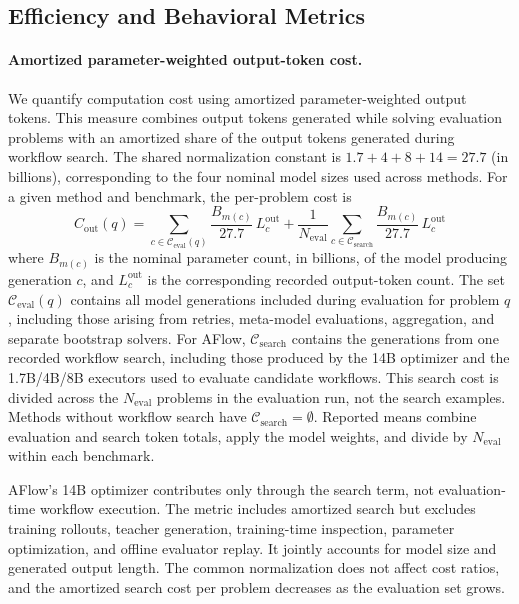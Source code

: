 \subsection{Efficiency and Behavioral Metrics}
\label{app:efficiency_metrics}

\paragraph{Amortized parameter-weighted output-token cost.}
We quantify computation cost using amortized parameter-weighted output tokens. This measure combines output tokens generated while solving evaluation problems with an amortized share of the output tokens generated during workflow search. The shared normalization constant is $1.7+4+8+14=27.7$ (in billions), corresponding to the four nominal model sizes used across methods. For a given method and benchmark, the per-problem cost is
\begin{equation}
 C_{\mathrm{out}}(q)
 =\sum_{c\in\mathcal{C}_{\mathrm{eval}}(q)}
   \frac{B_{m(c)}}{27.7}\,L_c^{\mathrm{out}}
 +\frac{1}{N_{\mathrm{eval}}}
  \sum_{c\in\mathcal{C}_{\mathrm{search}}}
   \frac{B_{m(c)}}{27.7}\,L_c^{\mathrm{out}}
 \label{eq:app-weighted-tokens}
\end{equation}
where $B_{m(c)}$ is the nominal parameter count, in billions, of the model producing generation $c$, and $L_c^{\mathrm{out}}$ is the corresponding recorded output-token count. The set $\mathcal{C}_{\mathrm{eval}}(q)$ contains all model generations included during evaluation for problem $q$, including those arising from retries, meta-model evaluations, aggregation, and separate bootstrap solvers. For AFlow, $\mathcal{C}_{\mathrm{search}}$ contains the generations from one recorded workflow search, including those produced by the 14B optimizer and the 1.7B/4B/8B executors used to evaluate candidate workflows. This search cost is divided across the $N_{\mathrm{eval}}$ problems in the evaluation run, not the search examples. Methods without workflow search have $\mathcal{C}_{\mathrm{search}}=\emptyset$. Reported means combine evaluation and search token totals, apply the model weights, and divide by $N_{\mathrm{eval}}$ within each benchmark.

AFlow's 14B optimizer contributes only through the search term, not evaluation-time workflow execution. The metric includes amortized search but excludes training rollouts, teacher generation, training-time inspection, parameter optimization, and offline evaluator replay. It jointly accounts for model size and generated output length. The common normalization does not affect cost ratios, and the amortized search cost per problem decreases as the evaluation set grows.


